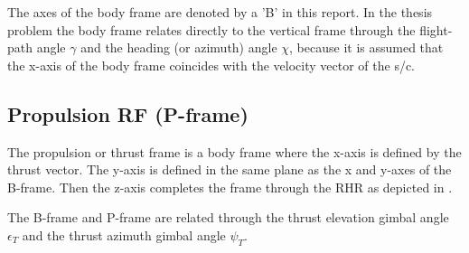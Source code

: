 The axes of the body frame are denoted by a 'B' in this report. In the thesis problem the body frame relates directly to the vertical frame through the flight-path angle $\gamma$ and the heading (or azimuth) angle $\chi$, because it is assumed that the x-axis of the body frame coincides with the velocity vector of the \ac{s/c}. 


 








\subsection{Propulsion \ac{RF} (P-frame)}
\label{subsec:propframe}
The propulsion or thrust frame is a body frame where the x-axis is defined by the thrust vector. The y-axis is defined in the same plane as the x and y-axes of the B-frame. Then the z-axis completes the frame through the \ac{RHR} as depicted in .

The B-frame and P-frame are related through the thrust elevation gimbal angle $\epsilon_{T}$ and the thrust azimuth gimbal angle $\psi_{T}$. 




